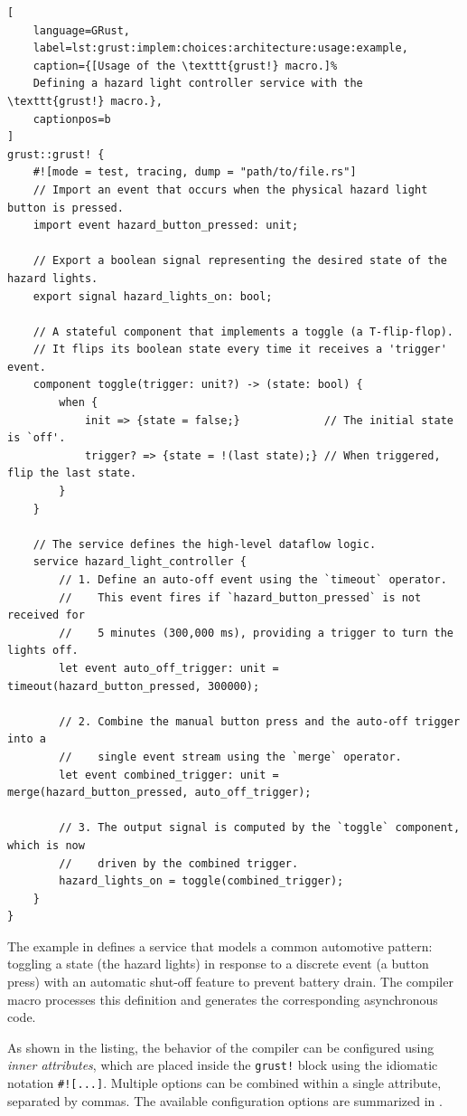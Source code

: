 \begin{lstlisting}[
    language=GRust,
    label=lst:grust:implem:choices:architecture:usage:example,
    caption={[Usage of the \texttt{grust!} macro.]%
    Defining a hazard light controller service with the \texttt{grust!} macro.},
    captionpos=b
]
grust::grust! {
    #![mode = test, tracing, dump = "path/to/file.rs"]
    // Import an event that occurs when the physical hazard light button is pressed.
    import event hazard_button_pressed: unit;

    // Export a boolean signal representing the desired state of the hazard lights.
    export signal hazard_lights_on: bool;

    // A stateful component that implements a toggle (a T-flip-flop).
    // It flips its boolean state every time it receives a 'trigger' event.
    component toggle(trigger: unit?) -> (state: bool) {
        when {
            init => {state = false;}             // The initial state is `off'.
            trigger? => {state = !(last state);} // When triggered, flip the last state.
        }
    }

    // The service defines the high-level dataflow logic.
    service hazard_light_controller {
        // 1. Define an auto-off event using the `timeout` operator. 
        //    This event fires if `hazard_button_pressed` is not received for
        //    5 minutes (300,000 ms), providing a trigger to turn the lights off.
        let event auto_off_trigger: unit = timeout(hazard_button_pressed, 300000);

        // 2. Combine the manual button press and the auto-off trigger into a
        //    single event stream using the `merge` operator.
        let event combined_trigger: unit = merge(hazard_button_pressed, auto_off_trigger);

        // 3. The output signal is computed by the `toggle` component, which is now
        //    driven by the combined trigger.
        hazard_lights_on = toggle(combined_trigger);
    }
}
\end{lstlisting}

The example in  defines a service that
models a common automotive pattern: toggling a state (the hazard lights) in response to a discrete
event (a button press) with an automatic shut-off feature to prevent battery drain. The compiler
macro processes this definition and generates the corresponding asynchronous \Rust code.

As shown in the listing, the behavior of the compiler can be configured using
\emph{inner attributes}, which are placed inside the \texttt{grust!} block using the idiomatic \Rust
notation \texttt{\#![...]}. Multiple options can be combined within a single attribute, separated by
commas. The available configuration options are summarized in .

